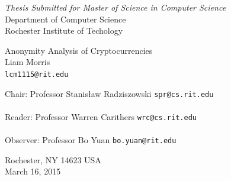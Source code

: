 \documentclass[11pt]{article}
\begin{document}
\thispagestyle{empty}
\begin{center}
    \begin{Large}
        \emph{Thesis Submitted for Master of Science in Computer Science} \\
        Department of Computer Science \\
        Rochester Institute of Techology \\
    \end{Large}
    \vspace{4em}
    {\huge Anonymity Analysis of Cryptocurrencies} \\
    \vspace{3em}
    {\LARGE Liam Morris} \\
    {\tt lcm1115@rit.edu} \\
    \vspace{3em}
    \begin{adjustwidth}{.5in}{.5in}
        Chair: Professor Stanis{\l}aw Radziszowski \hfill {\tt spr@cs.rit.edu} \\
        \vspace{2em}
        \hrulefill \\
        \vspace{3em}
        Reader: Professor Warren Carithers \hfill {\tt wrc@cs.rit.edu} \\
        \vspace{2em}
        \hrulefill \\
        \vspace{3em} Observer: Professor Bo Yuan \hfill {\tt bo.yuan@rit.edu} \\
        \vspace{2em}
        \hrulefill
    \end{adjustwidth}
    \vspace{2em} Rochester, NY 14623 USA \\
    \vspace{2em}
    March 16, 2015
\end{center}
\pagebreak
\thispagestyle{empty}
\end{document}
